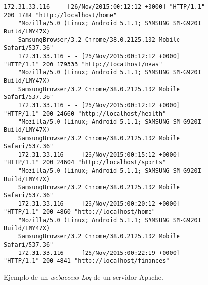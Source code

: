 \begin{figure}[tb]
	\centering
	\begin{lstlisting}[frame=single,basicstyle=\ttfamily\tiny,]
	172.31.33.116 - - [26/Nov/2015:00:12:12 +0000] "HTTP/1.1" 200 1784 "http://localhost/home" 
	"Mozilla/5.0 (Linux; Android 5.1.1; SAMSUNG SM-G920I Build/LMY47X) 
	SamsungBrowser/3.2 Chrome/38.0.2125.102 Mobile Safari/537.36"
	172.31.33.116 - - [26/Nov/2015:00:12:12 +0000] "HTTP/1.1" 200 179333 "http://localhost/news" 
	"Mozilla/5.0 (Linux; Android 5.1.1; SAMSUNG SM-G920I Build/LMY47X) 
	SamsungBrowser/3.2 Chrome/38.0.2125.102 Mobile Safari/537.36"
	172.31.33.116 - - [26/Nov/2015:00:12:12 +0000] "HTTP/1.1" 200 24660 "http://localhost/health" 
	"Mozilla/5.0 (Linux; Android 5.1.1; SAMSUNG SM-G920I Build/LMY47X) 
	SamsungBrowser/3.2 Chrome/38.0.2125.102 Mobile Safari/537.36"
	172.31.33.116 - - [26/Nov/2015:00:15:12 +0000] "HTTP/1.1" 200 24604 "http://localhost/sports" 
	"Mozilla/5.0 (Linux; Android 5.1.1; SAMSUNG SM-G920I Build/LMY47X) 
	SamsungBrowser/3.2 Chrome/38.0.2125.102 Mobile Safari/537.36"
	172.31.33.116 - - [26/Nov/2015:00:20:12 +0000] "HTTP/1.1" 200 4860 "http://localhost/home" 
	"Mozilla/5.0 (Linux; Android 5.1.1; SAMSUNG SM-G920I Build/LMY47X) 
	SamsungBrowser/3.2 Chrome/38.0.2125.102 Mobile Safari/537.36"
	172.31.33.116 - - [26/Nov/2015:00:22:19 +0000] "HTTP/1.1" 200 4841 "http://localhost/finances" 
	\end{lstlisting}
		\caption{Ejemplo de un \emph{webaccess Log} de un servidor Apache.}
		\label{fig:accesslog-apache-teleton}
	\end{figure}
